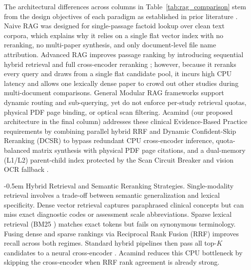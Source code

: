 \documentclass[10pt]{SPIIRAS_Proceedings}
\makeatletter
\renewcommand\subsection{\@startsection{subsection}{2}{\parindent}%
  {\z@}%
  {-0.5em}%
  {\normalfont\normalsize\bfseries}}
\makeatother
\begin{document}
The architectural differences across columns in Table~\ref{tab:rag_comparison} stem from the design objectives of each paradigm as established in prior literature \cite{gao2023retrieval,gao2024modular}. Naive RAG \cite{lewis2020retrieval,izacard2021leveraging} was designed for single-passage factoid lookup over clean text corpora, which explains why it relies on a single flat vector index with no reranking, no multi-paper synthesis, and only document-level file name attribution. Advanced RAG \cite{gao2023retrieval,yan2024corrective} improves passage ranking by introducing sequential hybrid retrieval and full cross-encoder reranking \cite{chen2024bge}; however, because it reranks every query and draws from a single flat candidate pool, it incurs high CPU latency and allows one lexically dense paper to crowd out other studies during multi-document comparisons. General Modular RAG frameworks \cite{gao2024modular,liu2023llamaindex} support dynamic routing and sub-querying, yet do not enforce per-study retrieval quotas, physical PDF page binding, or optical scan filtering. Acamind (our proposed architecture in the final column) addresses these clinical Evidence-Based Practice requirements \cite{sackett1996evidence,moher2009preferred} by combining parallel hybrid RRF \cite{cormack2009reciprocal} and Dynamic Confident-Skip Reranking (DCSR) to bypass redundant CPU cross-encoder inference, quota-balanced matrix synthesis with physical PDF page citations, and a dual-memory (L1/L2) parent-child index protected by the Scan Circuit Breaker and vision OCR fallback \cite{lo2020s2orc}.

\subsection{Hybrid Retrieval and Semantic Reranking Strategies.} Single-modality retrieval involves a trade-off between semantic generalization and lexical specificity. Dense vector retrieval \cite{wang2022text} captures paraphrased clinical concepts but can miss exact diagnostic codes or assessment scale abbreviations. Sparse lexical retrieval (BM25 \cite{robertson2009probabilistic}) matches exact tokens but fails on synonymous terminology. Fusing dense and sparse rankings via Reciprocal Rank Fusion (RRF) \cite{cormack2009reciprocal} improves recall across both regimes. Standard hybrid pipelines then pass all top-$K$ candidates to a neural cross-encoder \cite{chen2024bge,xiao2023cpack,baai2024bgererankerv2m3}. Acamind reduces this CPU bottleneck by skipping the cross-encoder when RRF rank agreement is already strong.
\end{document}
